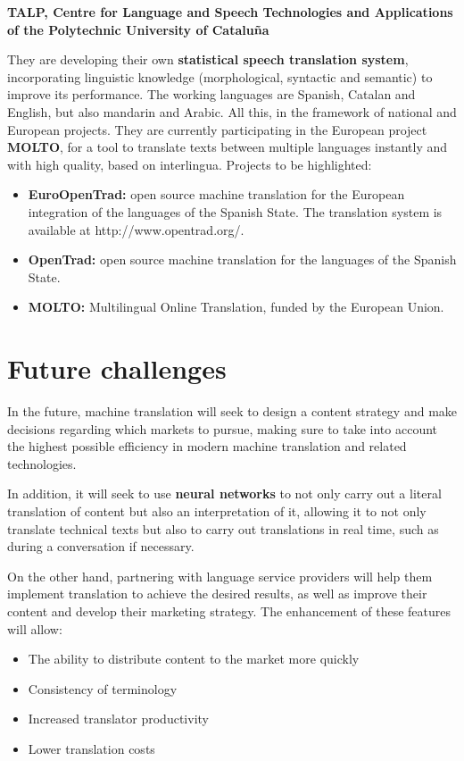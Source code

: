 \documentclass[a4paper]{article}
\theoremstyle{plain}
\theoremstyle{definition}
\begin{document}
   \begin{flushleft}
    \textbf{TALP, Centre for Language and Speech Technologies and Applications of the Polytechnic University of Cataluña}
   \end{flushleft}
    They are developing their own \textbf{statistical speech translation system}, incorporating linguistic knowledge (morphological, syntactic and semantic) to improve its performance. The working languages are Spanish, Catalan and English, but also mandarin and Arabic. All this, in the framework of national and European projects. They are currently participating in the European project \textbf{MOLTO}, for a tool to translate texts between multiple languages instantly and with high quality, based on interlingua. Projects to be highlighted:
    \begin{itemize}
        \item \textbf{EuroOpenTrad: }open source machine translation for the European integration of the languages of the Spanish State. The translation system is available at http://www.opentrad.org/.
        \item\textbf{OpenTrad: }open source machine translation for the languages of the Spanish State.
        \item \textbf{MOLTO: }Multilingual Online Translation, funded by the European Union.
    \end{itemize}

	\label{sec:examples}
	\section{Future challenges}
	\label{sec:examples}

	In the future, machine translation will seek to design a content strategy and make decisions regarding which markets to pursue, making sure to take into account the highest possible efficiency in modern machine translation and related technologies.\newline

    In addition, it will seek to use \textbf{neural networks} to not only carry out a literal translation of content but also an interpretation of it, allowing it to not only translate technical texts but also to carry out translations in real time, such as during a conversation if necessary.\newline

    On the other hand, partnering with language service providers will help them implement translation to achieve the desired results, as well as improve their content and develop their marketing strategy. The enhancement of these features will allow:
    \begin{itemize}
        \item The ability to distribute content to the market more quickly
        \item Consistency of terminology
        \item Increased translator productivity
        \item Lower translation costs
    \end{itemize}
   
\end{document}
